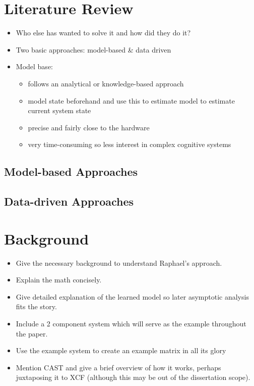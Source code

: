 \documentclass[11pt, a4paper]{report}
\begin{document}
\chapter{Literature Review}
\label{cha:lit-review}

\begin{itemize}
\item Who else has wanted to solve it and how did they do it?
\item Two basic approaches: model-based \& data driven
\item Model base:
  \begin{itemize}
  \item follows an analytical or knowledge-based approach
  \item model state beforehand and use this to estimate model to
    estimate current system state
  \item precise and fairly close to the hardware
  \item very time-consuming so less interest in complex cognitive
    systems
  \end{itemize}
\end{itemize}

\section{Model-based Approaches}
\section{Data-driven Approaches}

\chapter{Background}\label{cha:background}

\begin{itemize}
\item Give the necessary background to understand Raphael's approach.
\item Explain the math concisely.
\item Give detailed explanation of the learned model so later
  asymptotic analysis fits the story.
\item Include a 2 component system which will serve as the example
  throughout the paper.
\item Use the example system to create an example matrix in all its
  glory
\item Mention CAST and give a brief overview of how it works, perhaps
  juxtaposing it to XCF (although this may be out of the dissertation
  scope).
\end{itemize}
\end{document}
